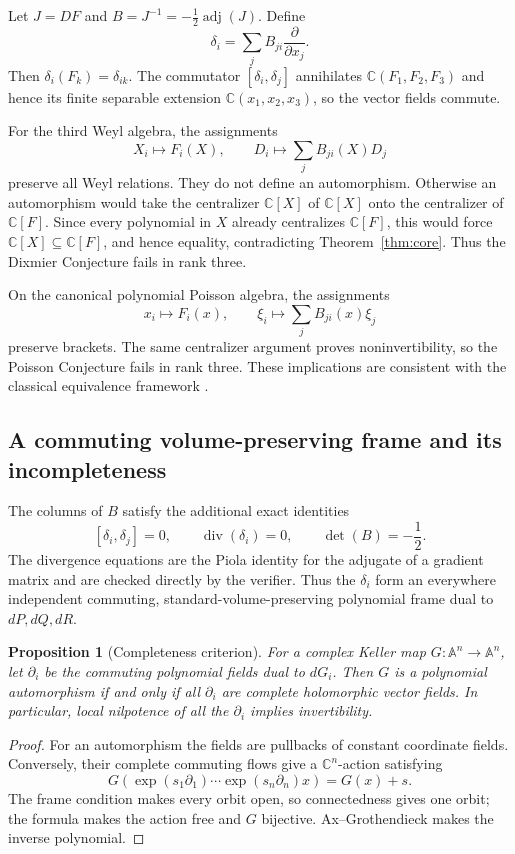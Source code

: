 \documentclass[11pt]{article}
\newtheorem{proposition}[theorem]{Proposition}
\theoremstyle{remark}
\newcommand{\A}{\mathbb A}
\newcommand{\C}{\mathbb C}
\begin{document}
Let $J=DF$ and $B=J^{-1}=-\tfrac12\operatorname{adj}(J)$. Define
\[
\delta_i=\sum_jB_{ji}\frac{\partial}{\partial x_j}.
\]
Then $\delta_i(F_k)=\delta_{ik}$. The commutator
$[\delta_i,\delta_j]$ annihilates $\C(F_1,F_2,F_3)$ and hence its finite
separable extension $\C(x_1,x_2,x_3)$, so the vector fields commute.

For the third Weyl algebra, the assignments
\[
X_i\mapsto F_i(X),\qquad D_i\mapsto\sum_jB_{ji}(X)D_j
\]
preserve all Weyl relations. They do not define an automorphism. Otherwise an
automorphism would take the centralizer $\C[X]$ of $\C[X]$ onto the centralizer
of $\C[F]$. Since every polynomial in $X$ already centralizes $\C[F]$, this
would force $\C[X]\subseteq\C[F]$, and hence equality, contradicting
Theorem~\ref{thm:core}. Thus the Dixmier Conjecture fails in rank three.

On the canonical polynomial Poisson algebra, the assignments
\[
x_i\mapsto F_i(x),\qquad \xi_i\mapsto\sum_jB_{ji}(x)\xi_j
\]
preserve brackets. The same centralizer argument proves noninvertibility, so
the Poisson Conjecture fails in rank three. These implications are consistent
with the classical equivalence framework \cite{ae2007}.

\subsection{A commuting volume-preserving frame and its incompleteness}

The columns of $B$ satisfy the additional exact identities
\[
[\delta_i,\delta_j]=0,\qquad
\operatorname{div}(\delta_i)=0,\qquad
\det(B)=-\frac12.
\]
The divergence equations are the Piola identity for the adjugate of a gradient
matrix and are checked directly by the verifier. Thus the $\delta_i$ form an
everywhere independent commuting, standard-volume-preserving polynomial frame
dual to $dP,dQ,dR$.

\begin{proposition}[Completeness criterion]
For a complex Keller map $G:\A^n\to\A^n$, let $\partial_i$ be the commuting
polynomial fields dual to $dG_i$. Then $G$ is a polynomial automorphism if and
only if all $\partial_i$ are complete holomorphic vector fields. In
particular, local nilpotence of all the $\partial_i$ implies invertibility.
\end{proposition}
\begin{proof}
For an automorphism the fields are pullbacks of constant coordinate fields.
Conversely, their complete commuting flows give a $\C^n$-action satisfying
\[
G(\exp(s_1\partial_1)\cdots\exp(s_n\partial_n)x)=G(x)+s.
\]
The frame condition makes every orbit open, so connectedness gives one orbit;
the formula makes the action free and $G$ bijective. Ax--Grothendieck makes
the inverse polynomial.
\end{proof}
\end{document}
